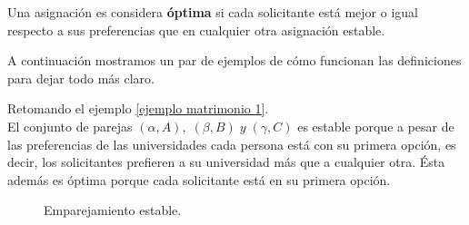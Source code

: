 \begin{dfn}{\cite{GaleShapley}}
\label{optima}
Una asignación es considera \textbf{óptima} si cada solicitante está mejor o igual respecto a sus preferencias que en cualquier otra asignación estable. 
\end{dfn}

A continuación mostramos un par de ejemplos de cómo funcionan las definiciones para dejar todo más claro. 

\begin{eje}
Retomando el ejemplo \ref{ejemplo matrimonio 1}. \\
El conjunto de parejas $(\alpha, A), \; (\beta, B)\; y\; (\gamma, C)$ es estable porque a pesar de las preferencias de las universidades cada persona está con su primera opción, es decir, los solicitantes prefieren a su universidad más que a cualquier otra. Ésta además es óptima porque cada solicitante está en su primera opción.
\begin{figure}[H]\centering


\caption{Emparejamiento estable.}
\end{figure}

\fin
\end{eje}
